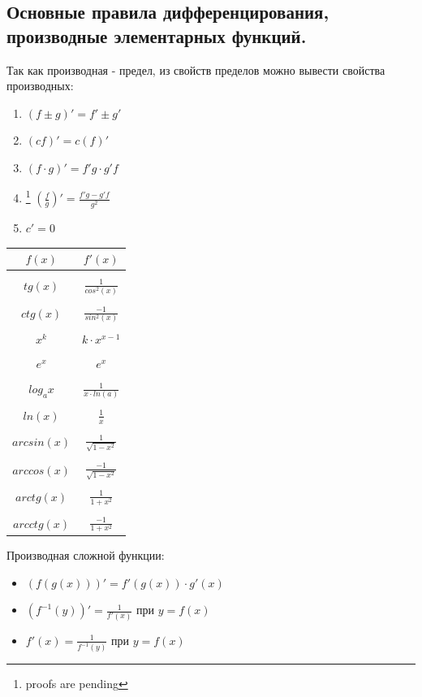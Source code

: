 \documentclass[oneside]{book}
\begin{document}
\begin{enumerate}
\chapter[правила дифференцирования]{Основные правила дифференцирования, производные элементарных функций.\\}
Так как производная - предел, из свойств пределов можно вывести свойства производных:
\begin{enumerate}
  \item $(f \pm g)' = f' \pm g'$
  \item $(cf)' = c(f)'$
  \item $(f \cdot g)' = f'g \cdot g'f$
  \item\footnote{proofs are pending} $(\frac{f}{g})' = \frac{f'g - g'f}{g^2}$
  \item $c' = 0$
\end{enumerate}
  \begin{center}
      \begin{tabular}{c|c}
        $f(x)$ & $f'(x)$ \\
        \hline \\
        $tg(x)$ & $\frac{1}{cos^2(x)}$ \\
          \hline \\
        $ctg(x)$ & $\frac{-1}{sin^2(x)}$ \\
          \hline \\
        $x^k$ & $k \cdot x^{x-1}$ \\
          \hline \\
        $e^x$ & $e^x$ \\
          \hline \\
        $log_a x$ & $\frac{1}{x \cdot ln(a)}$ \\
          \hline \\
        $ln(x)$ & $\frac{1}{x}$ \\
          \hline \\
        $arcsin(x)$ & $\frac{1}{\sqrt{1 - x^2}}$ \\
          \hline \\
        $arccos(x)$ & $\frac{-1}{\sqrt{1 - x^2}}$ \\
          \hline \\
        $arctg(x)$ & $\frac{1}{1 + x^2}$ \\
          \hline \\
        $arcctg(x)$ & $\frac{-1}{1 + x^2}$ \\
      \end{tabular}
  \end{center}
Производная сложной функции:
\begin{itemize}
  \item $(f(g(x)))' = f'(g(x)) \cdot g'(x)$
  \item $(f^{-1}(y))' = \frac{1}{f'(x)}$ при $y = f(x)$
  \item $f'(x) = \frac{1}{f^{-1}(y)}$ при $y = f(x)$


\end{itemize}
\end{enumerate}
\end{document}
